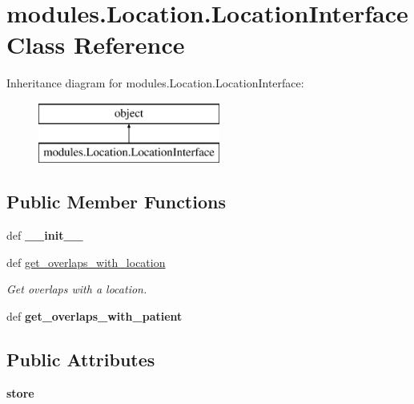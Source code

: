 \hypertarget{classmodules_1_1_location_1_1_location_interface}{\section{modules.\-Location.\-Location\-Interface Class Reference}
\label{classmodules_1_1_location_1_1_location_interface}
}
Inheritance diagram for modules.\-Location.\-Location\-Interface\-:\begin{figure}[H]
\begin{center}
\leavevmode
\includegraphics[height=2.000000cm]{classmodules_1_1_location_1_1_location_interface}
\end{center}
\end{figure}
\subsection*{Public Member Functions}
\begin{DoxyCompactItemize}
\item 
\hypertarget{classmodules_1_1_location_1_1_location_interface_a2471fcaae71fa16c1e8221279c690f3d}{def {\bfseries \-\_\-\-\_\-init\-\_\-\-\_\-}}\label{classmodules_1_1_location_1_1_location_interface_a2471fcaae71fa16c1e8221279c690f3d}

\item 
def \hyperlink{classmodules_1_1_location_1_1_location_interface_ab9bdfdc0a0595ecd79e680bf37beb87d}{get\-\_\-overlaps\-\_\-with\-\_\-location}
\begin{DoxyCompactList}\small\item\em Get overlaps with a location. \end{DoxyCompactList}\item 
\hypertarget{classmodules_1_1_location_1_1_location_interface_a6ee9111bccd8d5fbf747450799a1d25e}{def {\bfseries get\-\_\-overlaps\-\_\-with\-\_\-patient}}\label{classmodules_1_1_location_1_1_location_interface_a6ee9111bccd8d5fbf747450799a1d25e}

\end{DoxyCompactItemize}
\subsection*{Public Attributes}
\begin{DoxyCompactItemize}
\item 
\hypertarget{classmodules_1_1_location_1_1_location_interface_a756e94a9b2492c21bb92de0fdfbb2eb6}{{\bfseries store}}\label{classmodules_1_1_location_1_1_location_interface_a756e94a9b2492c21bb92de0fdfbb2eb6}

\end{DoxyCompactItemize}



